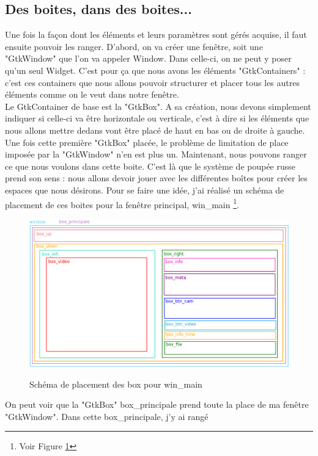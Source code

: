 \documentclass[11pt,french,a4paper]{report}
\begin{document}
        \subsection{Des boites, dans des boites...}
Une fois la façon dont les éléments et leurs paramètres sont gérés acquise, il faut ensuite pouvoir les ranger. 
D'abord, on va créer une fenêtre, soit une "GtkWindow" que l'on va appeler Window. Dans celle-ci, on ne peut y poser qu'un seul Widget. 
C'est pour ça que nous avons les éléments "GtkContainers" : c'est ces containers que nous allons pouvoir structurer et placer tous 
les autres éléments comme on le veut dans notre fenêtre. \\
Le GtkContainer de base est la "GtkBox". A sa création, nous devons simplement indiquer si celle-ci va être horizontale ou verticale, 
c'est à dire si les éléments que nous allons mettre dedans vont être placé de haut en bas ou de droite à gauche. 
Une fois cette première "GtkBox" placée, le problème de limitation de place imposée par la "GtkWindow" n'en est plus un. 
Maintenant, nous pouvons ranger ce que nous voulons dans cette boite. C'est là que le système de poupée russe prend son sens : 
nous allons devoir jouer avec les différentes boîtes pour créer les espaces que nous désirons. 
Pour se faire une idée, j'ai réalisé un schéma de placement de ces boites pour la fenêtre principal, win\_main 
\footnote{Voir Figure \ref{sch_box_win_main}}.
\begin{figure}[!h]
    \centering
        \includegraphics[scale=0.5]{../images/dia/schema_bloc_mainwin.png} \\
        \caption{Schéma de placement des box pour win\_main}
        \label{sch_box_win_main}
\end{figure}
On peut voir que la "GtkBox" box\_principale prend toute la place de ma fenêtre "GtkWindow". Dans cette box\_principale, j'y ai rangé 
\end{document}
